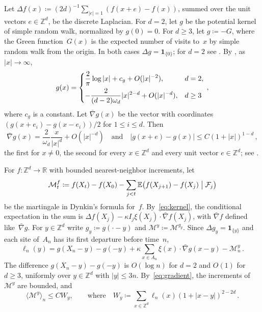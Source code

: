 \documentclass[11pt]{amsart}
\theoremstyle{plain}
\theoremstyle{definition}
\newcommand{\Z}{\mathbb Z}
\newcommand{\R}{\mathbb R}
\newcommand{\E}{\mathbb E}
\newcommand{\drift}{\kappa}
\newcommand{\ind}{\mathbf 1}
\numberwithin{equation}{section}
\begin{document}
Let $\Delta f(x)\coloneqq(2d)^{-1}\sum_{|e|=1}(f(x+e)-f(x))$, summed over the unit vectors $e\in\Z^d$, be the discrete Laplacian. For $d=2$, let $g$ be the potential kernel of simple random walk, normalized by $g(0)=0$. For $d\geq3$, let $g\coloneqq-G$, where the Green function~$G(x)$ is the expected number of visits to~$x$ by simple random walk from the origin. In both cases $\Delta g=\ind_{\{0\}}$; for $d=2$ see \citet*[Proposition~4.4.2]{LawlerLimic2010}. By \citet[Theorems~4.3.1 and~4.4.4]{LawlerLimic2010}, as $|x|\to\infty$,
\begin{equation}\label{eq:kernel-asymptotics}
g(x)=\begin{dcases}
\frac2\pi\log|x|+c_g+O(|x|^{-2}),&d=2,\\
-\frac{2}{(d-2)\omega_d}|x|^{2-d}+O(|x|^{-d}),&d\geq3
\end{dcases}\, ,
\end{equation}
where $c_g$ is a constant. Let $\bar\nabla g(x)$ be the vector with coordinates $(g(x+e_i)-g(x-e_i))/2$ for $1\leq i\leq d$. Then
\begin{equation}\label{eq:gradient}
\bar\nabla g(x)=\frac2{\omega_d}\frac{x}{|x|^d}+O(|x|^{-d})
\quad\text{and}\quad
|g(x+e)-g(x)|\leq C(1+|x|)^{1-d}\, ,
\end{equation}
the first for $x\neq0$, the second for every $x\in\Z^d$ and every unit vector $e\in\Z^d$; see \citet[Corollaries~4.3.3 and~4.4.5]{LawlerLimic2010}.

For $f\colon\Z^d\to\R$ with bounded nearest-neighbor increments, let
\begin{equation*}
\mathcal M^f_t\coloneqq f(X_t)-f(X_0)-\sum_{j<t}\E\bigl(f(X_{j+1})-f(X_j)\bigm|\mathcal F_j\bigr)
\end{equation*}
be the martingale in Dynkin's formula for~$f$. By~\eqref{eq:kernel}, the conditional expectation in the sum is $\Delta f(X_j)-\drift I_j\xi(X_j)\cdot\bar\nabla f(X_j)$, with $\bar\nabla f$ defined like~$\bar\nabla g$. For $y\in\Z^d$ write $g_y\coloneqq g(\cdot-y)$ and $\mathcal M^y\coloneqq\mathcal M^{g_y}$. Since $\Delta g_y=\ind_{\{y\}}$ and each site of~$A_n$ has its first departure before time~$n$,
\begin{equation}\label{eq:dynkin}
\ell_n(y)=g(X_n-y)-g(-y)
+\drift\sum_{x\in A_n}\xi(x)\cdot\bar\nabla g(x-y)-\mathcal M_n^y\, .
\end{equation}
The difference $g(X_n-y)-g(-y)$ is $O(\log n)$ for $d=2$ and $O(1)$ for $d\geq3$, uniformly over $y\in\Z^d$ with $|y|\leq3n$. By~\eqref{eq:gradient}, the increments of~$\mathcal M^y$ are bounded, and
\begin{equation}\label{eq:bracket}
\langle\mathcal M^y\rangle_n\leq CW_y,\qquad\text{where}\quad
W_y\coloneqq\sum_{x\in\Z^d}\ell_n(x)(1+|x-y|)^{2-2d}\, .
\end{equation}
\end{document}
